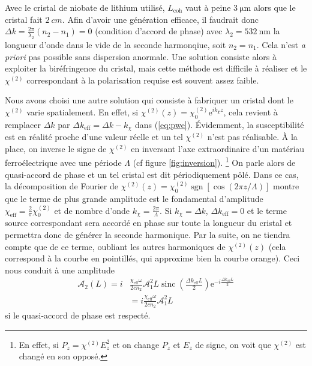 \documentclass[11pt,a4paper] { article}
\newcommand{\lmbd}[1]{$\SI{#1}{\nano\metre}$}
\newcommand{\A}{\mathcal{A}}
\newcommand{\e}[1]{\text{e}^{#1}}
\newcommand{\mathsc}[1]{\mathrm{\scriptscriptstyle {#1}}}
\begin{document}
Avec le cristal de niobate de lithium utilisé, $L_\mathsc{coh}$ vaut à peine $\SI{3}{\micro\meter}$ alors que le cristal fait $\SI{2}{cm}$.
Afin d'avoir une génération efficace, il faudrait donc $\Delta k = \frac{2\pi}{\lambda_2}(n_2-n_1) = 0$ (condition d'accord de phase) avec $\lambda_2=$\lmbd{532} la longueur d'onde dans le vide de la seconde harmonqiue, soit $n_2 = n_1$. Cela n'est \textit{a priori} pas possible sans dispersion anormale. Une solution consiste alors à exploiter la biréfringence du cristal, mais cette méthode est difficile à réaliser et le $\chi^{(2)}$ correspondant à la polarisation requise est souvent assez faible. 

Nous avons choisi une autre solution qui consiste à fabriquer un cristal dont le $\chi^{(2)}$ varie spatialement. En effet, si $\chi^{(2)}(z) = \chi^{(2)}_0 \e{i k_\chi z}$, cela revient à remplacer $\Delta k$ par $\boxed{ \Delta k_\mathsc{eff} = \Delta k - k_\chi }$ dans (\ref{eq:pwe}). 
Évidemment, la susceptibilité est en réalité proche d'une valeur réelle et un tel $\chi^{(2)}$ n'est pas réalisable. À la place, on inverse le signe de $\chi^{(2)}$ en inversant l'axe extraordinaire d'un matériau ferroélectrique avec une période $\Lambda$ (cf figure \ref{fig:inversion}). \footnote{En effet, si $P_z = \chi^{(2)} E_z^2$ et on change $P_z$ et $E_z$ de signe, on voit que $\chi^{(2)}$ est changé en son opposé.} 
On parle alors de quasi-accord de phase et un tel cristal est dit périodiquement pôlé. Dans ce cas, la décomposition de Fourier de $\chi^{(2)}(z) = \chi^{(2)}_0 \operatorname{sgn}[\cos(2\pi z/ \Lambda)]$ montre que le terme de plus grande amplitude est le fondamental d'amplitude $\boxed{ \chi_\mathsc{eff} = \frac2\pi \chi^{(2)}_0 }$ et de nombre d'onde $\boxed{ k_\chi = \frac{2\pi}{\Lambda} }$. 
Si $k_\chi = \Delta k$, $\Delta k_\mathsc{eff} = 0$ et le terme source correspondant sera accordé en phase sur toute la longueur du cristal et permettra donc de générer la seconde harmonique. Par la suite, on ne tiendra compte que de ce terme, oubliant les autres harmoniques de $\chi^{(2)}(z)$ (cela correspond à la courbe en pointillés, qui approxime bien la courbe orange).
Ceci nous conduit à une amplitude 
\begin{align}
	\A_2(L) = i &\frac{\chi_\mathsc{eff}\omega}{2 cn_2} \A_1^2 L \operatorname{sinc}\left( \frac{\Delta k_\mathsc{eff} L}{2} \right) 
	\e{-i\frac{\Delta k_\mathsc{eff} L}{2}} \\	
	&= i \frac{\chi_\mathsc{eff} \omega}{2 cn_2} \A_1^2L 
\end{align}
si le quasi-accord de phase est respecté.
\end{document}
